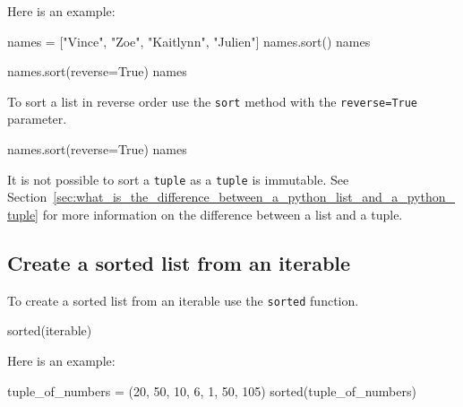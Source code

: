 Here is an example:




\begin{raw}
names = ["Vince", "Zoe", "Kaitlynn", "Julien"]
names.sort()
names
\end{raw}





\begin{pyin}
names.sort(reverse=True)
names
\end{pyin}





To sort a list in reverse order use the \texttt{sort} method with the \texttt{reverse=True}
parameter.




\begin{pyin}
names.sort(reverse=True)
names
\end{pyin}





\begin{raw}
\end{raw}






\begin{note}
It is not possible to sort a \texttt{tuple} as a \texttt{tuple} is immutable.
See
Section~\ref{sec:what_is_the_difference_between_a_python_list_and_a_python_tuple}
for more information on the difference between a list and a tuple.
\end{note}


\subsection{Create a sorted list from an iterable}
\label{\detokenize{building-tools/02-functions-and-data-structures/how/main:create-a-sorted-list-from-an-iterable}}

To create a sorted list from an iterable use the \texttt{sorted} function.


\begin{pyin}
sorted(iterable)
\end{pyin}



Here is an example:




\begin{pyin}
tuple_of_numbers = (20, 50, 10, 6, 1, 50, 105)
sorted(tuple_of_numbers)
\end{pyin}





